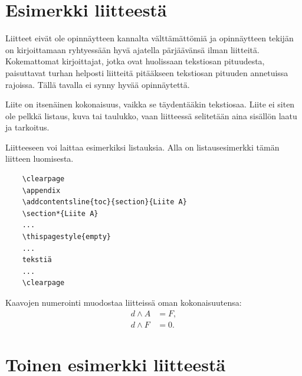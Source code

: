 \section{Esimerkki liitteestä\label{LiiteA}}

Liitteet eivät ole opinnäytteen kannalta välttämättömiä ja 
opinnäytteen tekijän on 
kirjoittamaan ryhtyessään hyvä ajatella pärjäävänsä ilman liitteitä.
Kokemattomat kirjoittajat, jotka ovat huolissaan
tekstiosan pituudesta, paisuttavat turhan 
helposti liitteitä pitääkseen tekstiosan pituuden annetuissa rajoissa.
Tällä tavalla ei synny hyvää opinnäytettä.   

Liite on itsenäinen kokonaisuus, vaikka se täydentääkin tekstiosaa.
Liite ei siten ole pelkkä listaus, kuva tai taulukko, vaan 
liitteessä selitetään aina sisällön laatu ja tarkoitus. 

Liitteeseen voi laittaa esimerkiksi listauksia. Alla on 
listausesimerkki tämän liitteen luomisesta. 

\begin{verbatim}
	\clearpage
	\appendix
	\addcontentsline{toc}{section}{Liite A}
	\section*{Liite A}
	...
	\thispagestyle{empty}
	...
	tekstiä
	...
	\clearpage
\end{verbatim}

Kaavojen numerointi muodostaa liitteissä oman kokonaisuutensa:
\begin{align}
d \wedge A &= F, \label{liitekaava1}\\
d \wedge F &= 0. \label{liitekaava2}
\end{align}


\clearpage
\section{Toinen esimerkki liitteestä\label{LiiteB}}


